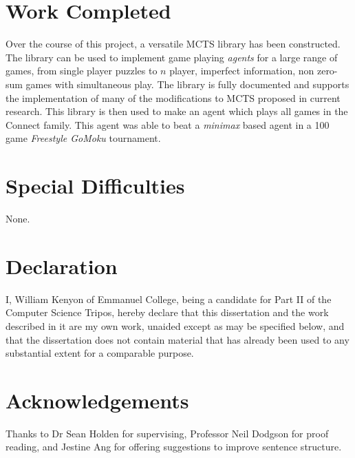 \documentclass[12pt,twoside,notitlepage]{report}
\theoremstyle{definition}
\begin{document}
\section*{Work Completed}
Over the course of this project, a versatile MCTS library has been constructed. The library can be used to implement game playing \textit{agents} for a large range of games, from single player puzzles to $n$ player, imperfect information, non zero-sum games with simultaneous play. The library is fully documented and supports the implementation of many of the modifications to MCTS proposed in current research. This library is then used to make an agent which plays all games in the Connect family. This agent was able to beat a \textit{minimax} based agent in a 100 game \textit{Freestyle GoMoku} tournament.

\section*{Special Difficulties}
None.

\newpage
\section*{Declaration}

I, William Kenyon of Emmanuel College, being a candidate for Part II of the Computer
Science Tripos, hereby declare
that this dissertation and the work described in it are my own work,
unaided except as may be specified below, and that the dissertation
does not contain material that has already been used to any substantial
extent for a comparable purpose.

\bigskip
{}

\medskip
{}

\cleardoublepage

\tableofcontents

\listoffigures

\newpage
\section*{Acknowledgements}

Thanks to Dr Sean Holden for supervising, Professor Neil Dodgson for proof reading, and Jestine Ang for offering suggestions to improve sentence structure.


\cleardoublepage        %
\end{document}
